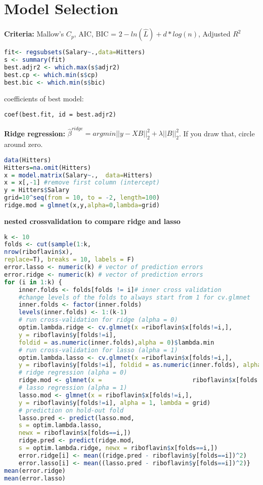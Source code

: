 \section{Model Selection}
\textbf{Criteria: } Mallow's $C_p$, AIC, BIC = $2-ln(\hat L) + d*log(n)$, Adjusted $R^2$
\begin{lstlisting}[language =R]
fit<- regsubsets(Salary~.,data=Hitters)
s <- summary(fit)
best.adjr2 <- which.max(s$adjr2)
best.cp <- which.min(s$cp)
best.bic <- which.min(s$bic)
\end{lstlisting}
coefficients of best model:
\begin{lstlisting}
coef(best.fit, id = best.adjr2)
\end{lstlisting}
\textbf{Ridge regression: } $\hat\beta^{ridge} = argmin ||y-XB||_2^2+ \lambda||B||_2^2$. If you draw that, circle around zero. 
\begin{lstlisting}[language=R]
data(Hitters)
Hitters=na.omit(Hitters)
x = model.matrix(Salary~.,  data=Hitters)
x = x[,-1] #remove first column (intercept)
y = Hitters$Salary
grid=10^seq(from = 10, to = -2, length=100)
ridge.mod = glmnet(x,y,alpha=0,lambda=grid)
\end{lstlisting}
\textbf{nested crossvalidation to compare ridge and lasso}
\begin{lstlisting}[language =R]
k <- 10
folds <- cut(sample(1:k,
nrow(riboflavin$x),
replace=T), breaks = 10, labels = F)
error.lasso <- numeric(k) # vector of prediction errors
error.ridge <- numeric(k) # vector of prediction errors
for (i in 1:k) {
	inner.folds <- folds[folds != i]# inner cross validation
	#change levels of the folds to always start from 1 for cv.glmnet
	inner.folds <- factor(inner.folds)
	levels(inner.folds) <- 1:(k-1)
	# run cross-validation for ridge (alpha = 0)
	optim.lambda.ridge <- cv.glmnet(x =riboflavin$x[folds!=i,],
	y = riboflavin$y[folds!=i],
	foldid = as.numeric(inner.folds),alpha = 0)$lambda.min
	# run cross-validation for lasso (alpha = 1)
	optim.lambda.lasso <- cv.glmnet(x =riboflavin$x[folds!=i,],
	y = riboflavin$y[folds!=i], foldid = as.numeric(inner.folds), alpha = 1)$lambda.min
	# ridge regression (alpha = 0)
	ridge.mod <- glmnet(x = 						riboflavin$x[folds!=i,], y = riboflavin$y[folds!=i], alpha = 0, lambda = grid)
	# lasso regression (alpha = 1)
	lasso.mod <- glmnet(x = riboflavin$x[folds!=i,],
	y = riboflavin$y[folds!=i], alpha = 1, lambda = grid)
	# prediction on hold-out fold
	lasso.pred <- predict(lasso.mod,
	s = optim.lambda.lasso,
	newx = riboflavin$x[folds==i,])
	ridge.pred <- predict(ridge.mod,
	s = optim.lambda.ridge, newx = riboflavin$x[folds==i,])
	error.ridge[i] <- mean((ridge.pred - riboflavin$y[folds==i])^2)
	error.lasso[i] <- mean((lasso.pred - riboflavin$y[folds==i])^2)}
mean(error.ridge)
mean(error.lasso)
\end{lstlisting}
